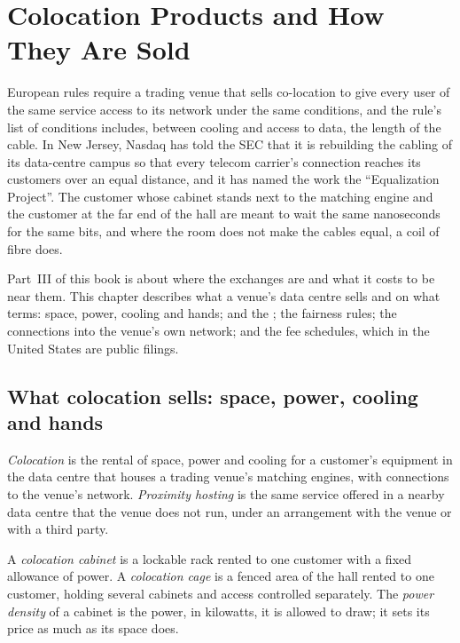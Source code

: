 \chapter{Colocation Products and How They Are Sold}\label{ch:nw:colocation-products-and-how-they-are-sold}

European rules require a trading venue that sells co-location to give every user of the same service access to its network under the
same conditions, and the rule's list of conditions includes, between cooling and access to data, the length of the cable. In New
Jersey, Nasdaq has told the SEC that it is rebuilding the cabling of its data-centre campus so that every telecom carrier's connection
reaches its customers over an equal distance, and it has named the work the ``Equalization Project''. The customer whose cabinet
stands next to the matching engine and the customer at the far end of the hall are meant to wait the same nanoseconds for the same
bits, and where the room does not make the cables equal, a coil of fibre does.

Part~III of this book is about where the exchanges are and what it costs to be near them. This chapter describes what a venue's
data centre sells and on what terms: space, power, cooling and hands;  and the ; the fairness rules; the
connections into the venue's own network; and the fee schedules, which in the United States are public filings.

\section{What colocation sells: space, power, cooling and hands}

\begin{definition}\label{def:nw:colocation-products-and-how-they-are-sold:colo}
\emph{Colocation} is the rental of space, power and cooling for a customer's equipment in the data centre that houses a
trading venue's matching engines, with connections to the venue's network. \emph{Proximity hosting} is the same
service offered in a nearby data centre that the venue does not run, under an arrangement with the venue or with a third party.
\end{definition}

\begin{definition}\label{def:nw:colocation-products-and-how-they-are-sold:cabinet}
A \emph{colocation cabinet} is a lockable rack rented to one customer with a fixed allowance of power. A
\emph{colocation cage} is a fenced area of the hall rented to one customer, holding several cabinets and access
controlled separately. The \emph{power density} of a cabinet is the power, in kilowatts, it is allowed to draw; it
sets its price as much as its space does.
\end{definition}

